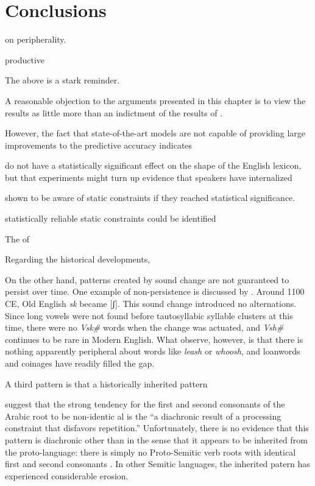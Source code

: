 \section{Conclusions}

\citet{Borowsky1989} on peripherality.

productive \citet{Duanmu2008}

The above is a stark reminder.


A reasonable objection to the arguments presented in this chapter is to view the results as little more than an indictment of the results of \citealt{Pierrehumbert1994}.

However, the fact that state-of-the-art models are not capable of providing large improvements to the predictive accuracy indicates


 do not have a statistically significant effect on the shape of the English lexicon, but that experiments might turn up evidence that speakers have internalized 


shown to be aware of static constraints if they reached statistical significance. 



 statistically reliable static constraints could be identified 

The of



Regarding the historical developments,

\citet{Martin2007}

On the other hand, patterns created by sound change are not guaranteed to persist over time. 
One example of non-persistence is discussed by \citet{Iverson2005}.  
Around 1100 CE, Old English \emph{sk} became [ʃ]. 
This sound change introduced no alternations.
Since long vowels were not found before tautosyllabic syllable clusters at this time, there were no \emph{V\lm sk\#} words when the
 change was actuated, and \emph{V\lm sh\#} continues to be rare in Modern English. 
What \citeauthor{Iverson2005} observe, however, is that there is nothing apparently peripheral about words like \emph{leash} or \emph{whoosh}, and loanwords and coinages have readily filled the gap.

A third pattern is that a historically inherited pattern

\citet[][140]{Frisch2004} suggest that the strong tendency for the first and second consonants of the Arabic root to be non-identic
al is the ``a diachronic result of a processing constraint that disfavors repetition.'' 
Unfortunately, there is no evidence that this pattern is diachronic other than in the sense that it appears to be inherited from the proto-language: there is simply no Proto-Semitic verb roots with identical first and second consonants \citep[][178]{Greenberg1950}. 
In other Semitic languages, the inherited patern has experienced considerable erosion. 

